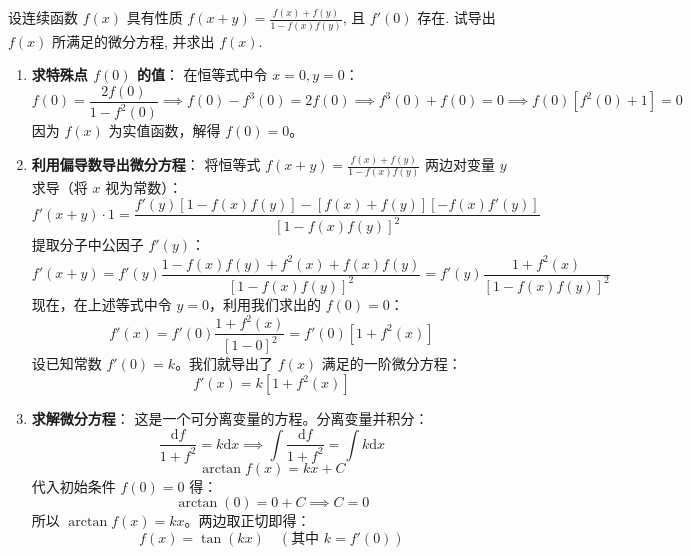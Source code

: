 \documentclass[lang=cn,11pt]{elegantbook}
\begin{document}
\begin{exercise}[由函数方程导出微分方程]
设连续函数 $f(x)$ 具有性质 $f(x+y)=\frac{f(x)+f(y)}{1-f(x)f(y)}$, 且 $f'(0)$ 存在. 试导出 $f(x)$ 所满足的微分方程, 并求出 $f(x)$.
\end{exercise}
\begin{solution}
\begin{enumerate}
    \item \textbf{求特殊点 $f(0)$ 的值}：
    在恒等式中令 $x = 0, y = 0$：
    \[
    f(0) = \frac{2f(0)}{1-f^2(0)} \implies f(0) - f^3(0) = 2f(0) \implies f^3(0) + f(0) = 0 \implies f(0)[f^2(0)+1] = 0
    \]
    因为 $f(x)$ 为实值函数，解得 $f(0) = 0$。
    
    \item \textbf{利用偏导数导出微分方程}：
    将恒等式 $f(x+y) = \frac{f(x)+f(y)}{1-f(x)f(y)}$ 两边对变量 $y$ 求导（将 $x$ 视为常数）：
    \[
    f'(x+y) \cdot 1 = \frac{f'(y)[1-f(x)f(y)] - [f(x)+f(y)][-f(x)f'(y)]}{[1-f(x)f(y)]^2}
    \]
    提取分子中公因子 $f'(y)$：
    \[
    f'(x+y) = f'(y) \frac{1 - f(x)f(y) + f^2(x) + f(x)f(y)}{[1-f(x)f(y)]^2} = f'(y) \frac{1 + f^2(x)}{[1-f(x)f(y)]^2}
    \]
    现在，在上述等式中令 $y = 0$，利用我们求出的 $f(0) = 0$：
    \[
    f'(x) = f'(0) \frac{1 + f^2(x)}{[1-0]^2} = f'(0) [1 + f^2(x)]
    \]
    设已知常数 $f'(0) = k$。我们就导出了 $f(x)$ 满足的一阶微分方程：
    \[
    f'(x) = k [1 + f^2(x)]
    \]
    
    \item \textbf{求解微分方程}：
    这是一个可分离变量的方程。分离变量并积分：
    \[
    \frac{\mathrm{d}f}{1 + f^2} = k \mathrm{d}x \implies \int \frac{\mathrm{d}f}{1 + f^2} = \int k \mathrm{d}x
    \]
    \[
    \arctan f(x) = kx + C
    \]
    代入初始条件 $f(0) = 0$ 得：
    \[
    \arctan(0) = 0 + C \implies C = 0
    \]
    所以 $\arctan f(x) = kx$。两边取正切即得：
    \[
    f(x) = \tan(kx) \quad (\text{其中 } k = f'(0))
    \]
\end{enumerate}
\end{solution}
\end{document}
